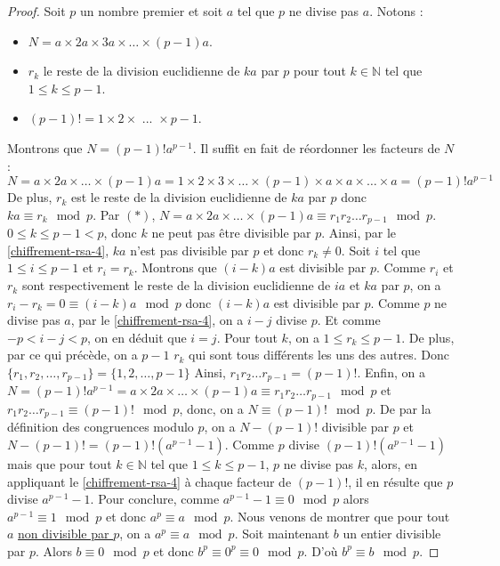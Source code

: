   \begin{proof}
    Soit $p$ un nombre premier et soit $a$ tel que $p$ ne divise pas $a$. Notons :
    \begin{itemize}
      \item $N = a \times 2a \times 3a \times \dots \times (p-1)a$.
      \item $r_k$ le reste de la division euclidienne de $ka$ par $p$ pour tout $k \in \mathbb{N}$ tel que $1 \leq k \leq p-1$.
      \item $(p-1)! = 1 \times 2 \times \text { ... } \times p-1$.
    \end{itemize}
    Montrons que $N = (p-1)! a^{p-1}$. Il suffit en fait de réordonner les facteurs de $N$ :
    \[ N = a \times 2a \times \dots \times (p-1)a = 1 \times 2 \times 3 \times \dots \times (p-1) \times a \times a \times \dots \times a = (p-1)!a^{p-1} \tag{$*$} \]
    De plus, $r_k$ est le reste de la division euclidienne de $ka$ par $p$ donc $ka \equiv r_k \mod p$. Par $(*)$, $N = a \times 2a \times \dots \times (p-1)a \equiv r_1 r_2 \dots r_{p-1} \mod p$. $0 \leq k \leq p-1 < p$, donc $k$ ne peut pas être divisible par $p$. Ainsi, par le \cref{chiffrement-rsa-4}, $ka$ n'est pas divisible par $p$ et donc $r_k \neq 0$.
    \newpar
    Soit $i$ tel que $1 \leq i \leq p-1$ et $r_i = r_k$. Montrons que $(i-k)a$ est divisible par $p$. Comme $r_i$ et $r_k$ sont respectivement le reste de la division euclidienne de $ia$ et $ka$ par $p$, on a $r_i - r_k = 0 \equiv (i-k)a \mod p$ donc $(i-k)a$ est divisible par $p$. Comme $p$ ne divise pas $a$, par le \cref{chiffrement-rsa-4}, on a $i-j$ divise $p$. Et comme $-p < i-j < p$, on en déduit que $i=j$.
    \newpar
    Pour tout $k$, on a $1 \leq r_k \leq p-1$. De plus, par ce qui précède, on a $p-1$ $r_k$ qui sont tous différents les uns des autres. Donc $\{r_1, r_2, \dots, r_{p-1} \} = \{1, 2, \dots, p-1 \}$  Ainsi, $r_1 r_2 \dots r_{p-1} = (p-1)!$.
    \newpar
    Enfin, on a $N = (p-1)!a^{p-1} = a \times 2a \times \dots \times (p-1)a \equiv r_1 r_2 \dots r_{p-1} \mod p$ et $r_1 r_2 \dots r_{p-1} \equiv (p-1)! \mod p$, donc, on a $N \equiv (p-1)! \mod p$. De par la définition des congruences modulo $p$, on a $N - (p-1)!$ divisible par $p$ et $N - (p-1)! = (p-1)!(a^{p-1} - 1)$. Comme $p$ divise $(p-1)!(a^{p-1} - 1)$ mais que pour tout $k \in \mathbb{N}$ tel que $1 \leq k \leq p-1$, $p$ ne divise pas $k$, alors, en appliquant le \cref{chiffrement-rsa-4} à chaque facteur de $(p-1)!$, il en résulte que $p$ divise $a^{p-1} - 1$.
    \newpar
    Pour conclure, comme $a^{p-1} - 1 \equiv 0 \mod p$ alors $a^{p-1} \equiv 1 \mod p$ et donc $a^p \equiv a \mod p$. Nous venons de montrer que pour tout $a$ \uline{non divisible par $p$}, on a $a^p \equiv a \mod p$. Soit maintenant $b$ un entier divisible par $p$. Alors $b \equiv 0 \mod p$ et donc $b^p \equiv 0^p \equiv 0 \mod p$. D'où $b^p \equiv b \mod p$.
  \end{proof}

